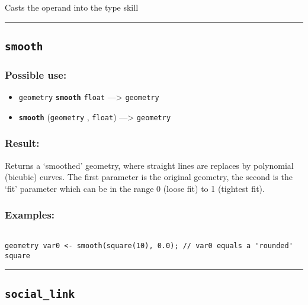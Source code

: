 \documentclass[]{book}
\providecommand{\tightlist}{%
  \setlength{\itemsep}{0pt}\setlength{\parskip}{0pt}}
\theoremstyle{definition}
\theoremstyle{definition}
\theoremstyle{definition}
\theoremstyle{remark}
\begin{document}
Casts the operand into the type skill

\begin{center}\rule{0.5\linewidth}{\linethickness}\end{center}

\subsection{\texorpdfstring{\texttt{smooth}}{smooth}}\label{smooth}

\subsubsection{Possible use:}\label{possible-use-484}

\begin{itemize}
\tightlist
\item
  \texttt{geometry} \textbf{\texttt{smooth}} \texttt{float}
  ---\textgreater{} \texttt{geometry}
\item
  \textbf{\texttt{smooth}} (\texttt{geometry} , \texttt{float})
  ---\textgreater{} \texttt{geometry}
\end{itemize}

\subsubsection{Result:}\label{result-468}

Returns a `smoothed' geometry, where straight lines are replaces by
polynomial (bicubic) curves. The first parameter is the original
geometry, the second is the `fit' parameter which can be in the range 0
(loose fit) to 1 (tightest fit).

\subsubsection{Examples:}\label{examples-338}

\begin{verbatim}
 
geometry var0 <- smooth(square(10), 0.0); // var0 equals a 'rounded' square
\end{verbatim}

\begin{center}\rule{0.5\linewidth}{\linethickness}\end{center}

\subsection{\texorpdfstring{\texttt{social\_link}}{social\_link}}\label{social_link}
\end{document}
